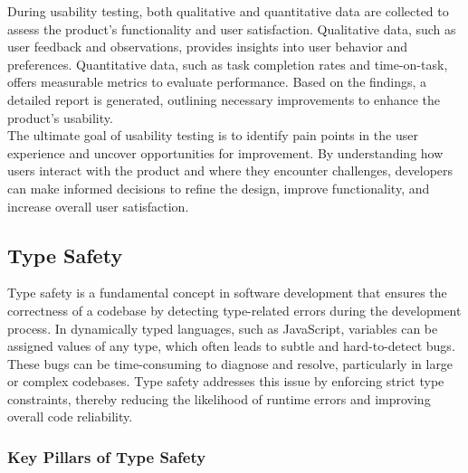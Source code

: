 During usability testing, both qualitative and quantitative data are collected to assess the product's functionality and user satisfaction. Qualitative data, such as user feedback and observations, provides insights into user behavior and preferences. Quantitative data, such as task completion rates and time-on-task, offers measurable metrics to evaluate performance. Based on the findings, a detailed report is generated, outlining necessary improvements to enhance the product's usability. \cite{geeksforgeeks:user-test} \\

The ultimate goal of usability testing is to identify pain points in the user experience and uncover opportunities for improvement. By understanding how users interact with the product and where they encounter challenges, developers can make informed decisions to refine the design, improve functionality, and increase overall user satisfaction. \cite{geeksforgeeks:user-test}

\subsection{Type Safety}

Type safety is a fundamental concept in software development that ensures the correctness of a codebase by detecting type-related errors during the development process. In dynamically typed languages, such as JavaScript, variables can be assigned values of any type, which often leads to subtle and hard-to-detect bugs. These bugs can be time-consuming to diagnose and resolve, particularly in large or complex codebases. Type safety addresses this issue by enforcing strict type constraints, thereby reducing the likelihood of runtime errors and improving overall code reliability. \cite{dev:type-safety}

\subsubsection*{Key Pillars of Type Safety}

